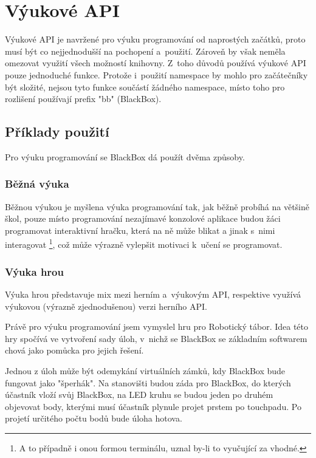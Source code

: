 \chapter{Výukové API}

Výukové API je navržené pro výuku programování od naprostých začátků, proto musí být co nejjednodušší na pochopení a~použití.
Zároveň by však neměla omezovat využití všech možností knihovny.
Z~toho důvodů používá výukové API pouze jednoduché funkce.
Protože i~použití namespace by mohlo pro začátečníky být složité, nejsou tyto funkce součástí žádného namespace, místo toho pro rozlišení používají prefix "bb" (BlackBox).



\section{Příklady použití}

Pro výuku programování se BlackBox dá použít dvěma způsoby.

\subsection{Běžná výuka}

Běžnou výukou je myšlena výuka programování tak, jak běžně probíhá na většině škol, pouze místo programování nezajímavé konzolové aplikace budou žáci programovat interaktivní hračku, která na ně může blikat a jinak s~nimi interagovat \footnote{A to případně i onou formou terminálu, uznal by-li to vyučující za vhodné.}, což může výrazně vylepšit motivaci k~učení se programovat.

\subsection{Výuka hrou}

Výuka hrou představuje mix mezi herním a~výukovým API, respektive využívá výukovou (výrazně zjednodušenou) verzi herního API.

Právě pro výuku programování jsem vymyslel hru pro Robotický tábor.
Idea této hry spočívá ve vytvoření sady úloh, v~nichž se BlackBox se základním softwarem chová jako pomůcka pro jejich řešení.

Jednou z úloh může být odemykání virtuálních zámků, kdy BlackBox bude fungovat jako "šperhák".
Na stanovišti budou záda pro BlackBox, do kterých účastník vloží svůj BlackBox, na LED kruhu se budou jeden po druhém objevovat body, kterými musí účastník plynule projet prstem po touchpadu.
Po projetí určitého počtu bodů bude úloha hotova.


